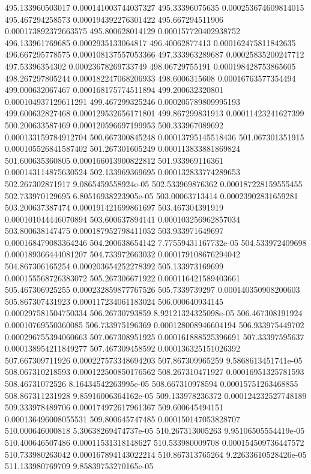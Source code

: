 {495.133960503017 0.000141003744037327
495.33396075635 0.000253674609814015
495.467294258573 0.000194392276301422
495.667294511906 0.000173892372663575
495.800628014129 0.000157720402938752
496.133961769685 0.0002935133064817
496.40062877413 0.000162475811842635
496.667295778575 0.000108137557053366
497.333963289687 0.00025835200247712
497.53396354302 0.00023678269733749
498.06729755191 0.000198428753865605
498.267297805244 0.000182247068206933
498.6006315608 0.00016763577354494
499.000632067467 0.000168175774511894
499.200632320801 0.000104937129611291
499.467299325246 0.000205789809995193
499.600632827468 0.000129532656171801
499.867299831913 0.00011423241627399
500.200633587469 0.000120596697199953
500.333967089692 0.000133159784912704
500.667300845248 0.00013795145518436
501.067301351915 0.000105526841587402
501.267301605249 0.000113833881869824
501.600635360805 0.000166013900822812
501.933969116361 0.000143114875630524
502.133969369695 0.000132833774289653
502.267302871917 9.0865459558924e-05
502.533969876362 0.000187228159555455
502.733970129695 6.80516938223905e-05
503.00063713414 0.00023902831659281
503.200637387474 0.000191421699861697
503.467304391919 0.000101044446070894
503.600637894141 0.000103256962857034
503.800638147475 0.000187952798411052
503.933971649697 0.000168479083364246
504.200638654142 7.77559431167732e-05
504.533972409698 0.000189366444081207
504.733972663032 0.000179108676294042
504.867306165254 0.000203654252278392
505.133973169699 0.000155568726383072
505.267306671922 0.000116421589403661
505.467306925255 0.000232859877767526
505.7339739297 0.000140350908200603
505.867307431923 0.000117234061183024
506.000640934145 0.000297581504750334
506.26730793859 8.92121324325098e-05
506.467308191924 0.00010769550360085
506.733975196369 0.000128008946604194
506.933975449702 0.000296755394060663
507.067308951925 0.000161888525396691
507.33397595637 0.000138954211849277
507.467309458592 0.000136325151026392
507.667309711926 0.000227573348694203
507.867309965259 9.5868613451741e-05
508.067310218593 0.000122500850176562
508.267310471927 0.00016951325781593
508.46731072526 8.16434542263995e-05
508.667310978594 0.00015751263468855
508.867311231928 9.85916006364162e-05
509.133978236372 0.000124232527748189
509.333978489706 0.000174972617961367
509.600645494151 0.000136496008055531
509.800645747485 0.000150147053828707
510.000646000818 5.30638269474737e-05
510.267313005263 9.95106505554419e-05
510.400646507486 0.00011531318148627
510.533980009708 0.000154509736447572
510.733980263042 0.000167894143022214
510.867313765264 9.22633610528426e-05
511.133980769709 9.85839753270165e-05
}
